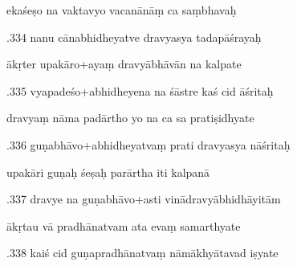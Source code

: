 \documentclass[article,12pt,a4paper]{memoir}%
\newcounter{parCount}
\begin{document}
	  
	  \pstart \leavevmode%
	ekaśeṣo na vaktavyo vacanānāṃ ca saṃbhavaḥ 
	{}
	\pend%
      

	  
	  \pstart {}.334 nanu cānabhidheyatve dravyasya tadapāśrayaḥ 
	{}
	\pend%
      

	  
	  \pstart \leavevmode%
	ākṛter upakāro+ayaṃ dravyābhāvān na kalpate 
	{}
	\pend%
      

	  
	  \pstart {}.335 vyapadeśo+abhidheyena na śāstre kaś cid āśritaḥ 
	{}
	\pend%
      

	  
	  \pstart \leavevmode%
	dravyaṃ nāma padārtho yo na ca sa pratiṣidhyate 
	{}
	\pend%
      

	  
	  \pstart {}.336 guṇabhāvo+abhidheyatvaṃ prati dravyasya nāśritaḥ 
	{}
	\pend%
      

	  
	  \pstart \leavevmode%
	upakāri guṇaḥ śeṣaḥ parārtha iti kalpanā 
	{}
	\pend%
      

	  
	  \pstart {}.337 dravye na guṇabhāvo+asti   vinādravyābhidhāyitām 
	{}
	\pend%
      

	  
	  \pstart \leavevmode%
	ākṛtau vā pradhānatvam ata evaṃ samarthyate 
	{}
	\pend%
      

	  
	  \pstart {}.338 kaiś cid guṇapradhānatvaṃ nāmākhyātavad iṣyate 
	{}
	\pend%
      
\end{document}
